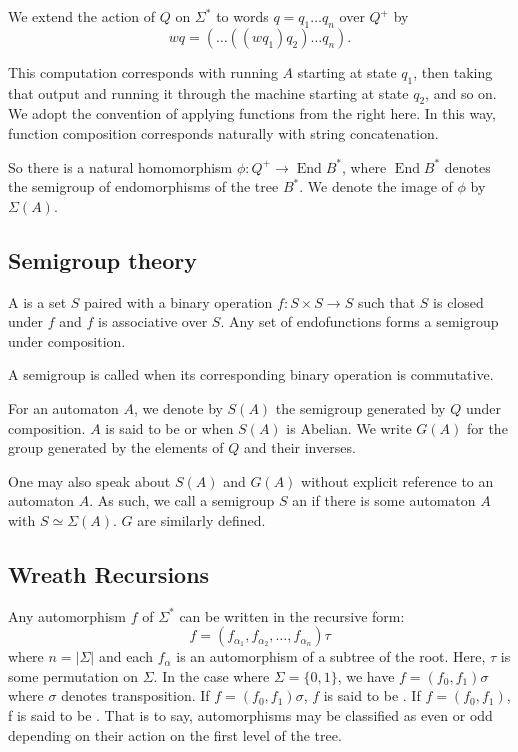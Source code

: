 \documentclass[11pt]{article}
\begin{document}
We extend the action of $Q$ on $\Sigma^*$ to words $q = q_1\ldots q_n$
over $Q^+$ by \[ wq = (\ldots((w q_1) q_2)\ldots q_n). \]

This computation corresponds with running $A$ starting at state $q_1$,
then taking that output and running it through the machine starting at
state $q_2$, and so on. We adopt the convention of applying functions
from the right here. In this way, function composition corresponds
naturally with string concatenation.

So there is a natural homomorphism
$\phi : Q^+ \rightarrow \operatorname{End}B^*$, where
$\operatorname{End}B^*$ denotes the semigroup of endomorphisms of the
tree $B^*$. We denote the image of $\phi$ by $\Sigma(A)$.

\subsection*{Semigroup theory}

A  is a set $S$ paired with a binary operation
$f : S \times S \rightarrow S$ such that $S$ is closed under $f$ and
$f$ is associative over $S$. Any set of endofunctions forms a
semigroup under composition.

A semigroup is called  when its corresponding binary
operation is commutative.

For an automaton $A$, we denote by $S(A)$ the semigroup generated by
$Q$ under composition. $A$ is said to be  or
 when $S(A)$ is Abelian. We write $G(A)$ for the group
generated by the elements of $Q$ and their inverses.

One may also speak about $S(A)$ and $G(A)$ without explicit reference
to an automaton $A$. As such, we call a semigroup $S$ an
 if there is some automaton $A$ with
$S \simeq \Sigma(A)$.
 $G$ are similarly defined.

\subsection*{Wreath Recursions}
Any automorphism $f$ of $\Sigma^*$ can be written in the recursive form:
\[ f = (f_{\alpha_1}, f_{\alpha_2}, \ldots, f_{\alpha_n})\tau \] where
$n = |\Sigma|$ and each $f_\alpha$ is an automorphism of a subtree of
the root. Here, $\tau$ is some permutation on $\Sigma$. In the case
where $\Sigma = \{0, 1\}$, we have $f = (f_0, f_1)\sigma$ where
$\sigma$ denotes transposition. If $f = (f_0, f_1)\sigma$, $f$ is said
to be . If $f = (f_0, f_1)$, f is said to be
. That is to say, automorphisms may be classified as even
or odd depending on their action on the first level of the tree.
\end{document}
